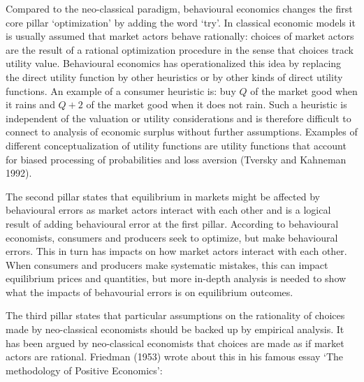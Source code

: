 \documentclass[
]{book}
\begin{document}
Compared to the neo-classical paradigm, behavioural economics changes the first core pillar `optimization' by adding the word `try'. In classical economic models it is usually assumed that market actors behave rationally: choices of market actors are the result of a rational optimization procedure in the sense that choices track utility value. Behavioural economics has operationalized this idea by replacing the direct utility function by other heuristics or by other kinds of direct utility functions. An example of a consumer heuristic is: buy \(Q\) of the market good when it rains and \(Q+2\) of the market good when it does not rain. Such a heuristic is independent of the valuation or utility considerations and is therefore difficult to connect to analysis of economic surplus without further assumptions. Examples of different conceptualization of utility functions are utility functions that account for biased processing of probabilities and loss aversion (Tversky and Kahneman 1992).

The second pillar states that equilibrium in markets might be affected by behavioural errors as market actors interact with each other and is a logical result of adding behavioural error at the first pillar. According to behavioural economists, consumers and producers seek to optimize, but make behavioural errors. This in turn has impacts on how market actors interact with each other. When consumers and producers make systematic mistakes, this can impact equilibrium prices and quantities, but more in-depth analysis is needed to show what the impacts of behavourial errors is on equilibrium outcomes.

The third pillar states that particular assumptions on the rationality of choices made by neo-classical economists should be backed up by empirical analysis. It has been argued by neo-classical economists that choices are made as if market actors are rational. Friedman (1953) wrote about this in his famous essay `The methodology of Positive Economics':
\end{document}
